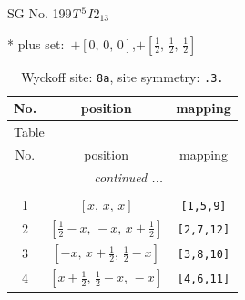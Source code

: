 \documentclass[fleqn,8pt]{jsarticle}
\begin{document}
\setcounter{MaxMatrixCols}{32}

\renewcommand{\tablename}{Table~}
\renewcommand{\figurename}{Figure~}
\begin{center}
\LARGE
SG No. 199\quad$T_{\rm }^{5}$\quad$I2_13$\quad[ cubic ]
\end{center}
* plus set:\,\,\,$+\left[ 0,\, 0,\, 0 \right]$,\quad $+\left[ \frac{1}{2},\, \frac{1}{2},\, \frac{1}{2} \right]$
\renewcommand{\arraystretch}{1.2}
\begin{longtable}{ccc}
\caption{Wyckoff site: {\tt 8a}, site symmetry: {\tt .3.}}
 \\
 \hline \hline
No. & position & mapping \\ \hline \endfirsthead

\multicolumn{2}{l}{\tablename\ \thetable{}} \\
 \hline \hline
No. & position & mapping \\ \hline \endhead

 \hline \hline
\multicolumn{2}{r}{\footnotesize\it continued ...} \\ \endfoot

 \hline \hline
\multicolumn{2}{r}{} \\ \endlastfoot

1 & $\left[ x,\, x,\, x \right]$ & {\tt [1,5,9]} \\ \hline
2 & $\left[ \frac{1}{2} - x,\, - x,\, x + \frac{1}{2} \right]$ & {\tt [2,7,12]} \\ \hline
3 & $\left[ - x,\, x + \frac{1}{2},\, \frac{1}{2} - x \right]$ & {\tt [3,8,10]} \\ \hline
4 & $\left[ x + \frac{1}{2},\, \frac{1}{2} - x,\, - x \right]$ & {\tt [4,6,11]} \\
\end{longtable}
\renewcommand{\arraystretch}{1.2}
\end{document}

